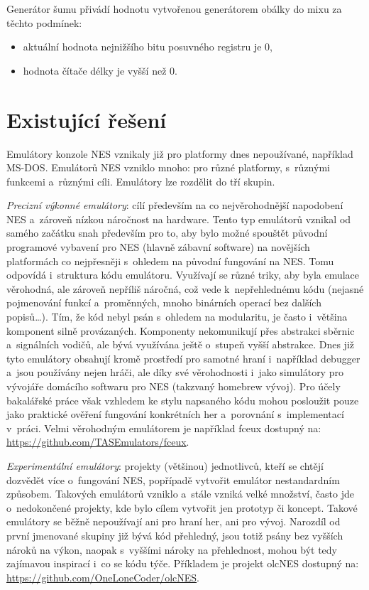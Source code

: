 Generátor šumu přivádí hodnotu vytvořenou generátorem obálky do mixu za těchto podmínek:
\begin{itemize}
	\item aktuální hodnota nejnižšího bitu posuvného registru je 0,
	\item hodnota čítače délky je vyšší než 0.
\end{itemize}

\section{Existující řešení}
Emulátory konzole NES vznikaly již pro platformy dnes nepoužívané, například MS-DOS. Emulátorů NES vzniklo mnoho: pro různé platformy, s~různými funkcemi a~různými cíli. Emulátory lze rozdělit do tří skupin.

\emph{Precizní výkonné emulátory}: cílí především na co nejvěrohodnější napodobení NES a~zároveň nízkou náročnost na hardware. Tento typ emulátorů vznikal od samého začátku snah především pro to, aby bylo možné spouštět původní programové vybavení pro NES (hlavně zábavní software) na novějších platformách co nejpřesněji s~ohledem na původní fungování na NES. Tomu odpovídá i~struktura kódu emulátoru. Využívají se různé triky, aby byla emulace věrohodná, ale zároveň nepříliš náročná, což vede k~nepřehlednému kódu (nejasné pojmenování funkcí a~proměnných, mnoho binárních operací bez dalších popisů\dots). Tím, že kód nebyl psán s~ohledem na modularitu, je často i~většina komponent silně provázaných. Komponenty nekomunikují přes abstrakci sběrnic a~signálních vodičů, ale bývá využívána ještě o~stupeň vyšší abstrakce. Dnes již tyto emulátory obsahují kromě prostředí pro samotné hraní i~například debugger a~jsou používány nejen hráči, ale díky své věrohodnosti i~jako simulátory pro vývojáře domácího softwaru pro NES (takzvaný homebrew vývoj). Pro účely bakalářské práce však vzhledem ke stylu napsaného kódu mohou posloužit pouze jako praktické ověření fungování konkrétních her a~porovnání s~implementací v~práci. Velmi věrohodným emulátorem je například fceux dostupný na: \url{https://github.com/TASEmulators/fceux}.

\emph{Experimentální emulátory}: projekty (většinou) jednotlivců, kteří se chtějí dozvědět více o~fungování NES, popřípadě vytvořit emulátor nestandardním způsobem. Takových emulátorů vzniklo a~stále vzniká velké množství, často jde o~nedokončené projekty, kde bylo cílem vytvořit jen prototyp či koncept. Takové emulátory se běžně nepoužívají ani pro hraní her, ani pro vývoj. Narozdíl od první jmenované skupiny již bývá kód přehledný, jsou totiž psány bez vyšších nároků na výkon, naopak s~vyššími nároky na přehlednost, mohou být tedy zajímavou inspirací i~co se kódu týče. Příkladem je projekt olcNES dostupný na: \url{https://github.com/OneLoneCoder/olcNES}.

